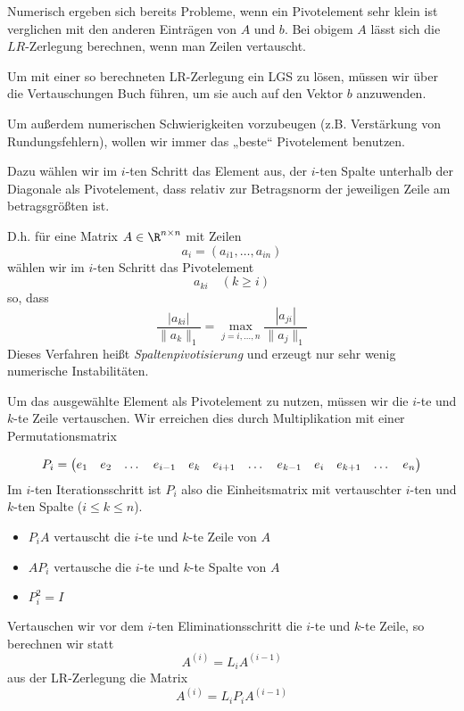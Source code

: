 \documentclass{mycourse}
\begin{document}
Numerisch ergeben sich bereits Probleme, wenn ein Pivotelement sehr klein ist verglichen mit den anderen Einträgen von $A$ und $b$.
Bei obigem $A$ lässt sich die $LR$-Zerlegung berechnen, wenn man Zeilen vertauscht.

Um mit einer so berechneten LR-Zerlegung ein LGS zu lösen, müssen wir über die Vertauschungen Buch führen, um sie auch auf den Vektor $b$ anzuwenden.

Um außerdem numerischen Schwierigkeiten vorzubeugen (z.B. Verstärkung von Rundungsfehlern), wollen wir immer das „beste“ Pivotelement benutzen.

Dazu wählen wir im $i$-ten Schritt das Element aus, der $i$-ten Spalte unterhalb der Diagonale als Pivotelement, dass relativ zur Betragsnorm der jeweiligen Zeile am betragsgrößten ist.

D.h. für eine Matrix $A\in \R^{n\times n}$ mit Zeilen
\[
	a_i = (a_{i1}, \dotsc, a_{in})
\]
wählen wir im $i$-ten Schritt das Pivotelement
\[
a_{ki} \quad (k\ge i)
\]
so, dass
\[
\frac {|a_{ki}|}{\|a_k\|_1} = \max_{j=i,\dotsc,n}\frac{|a_{ji}|}{\|a_j\|_1}
\]
Dieses Verfahren heißt \emph{Spaltenpivotisierung} und erzeugt nur sehr wenig numerische Instabilitäten.

Um das ausgewählte Element als Pivotelement zu nutzen, müssen wir die $i$-te und $k$-te Zeile vertauschen.
Wir erreichen dies durch Multiplikation mit einer Permutationsmatrix

\begin{align}
\label{eq:3.5}
\setcounter{MaxMatrixCols}{12}
P_i = \begin{pmatrix}
e_1 & e_2 & \dotsc & e_{i-1} & e_k & e_{i+1} & \dotsc & e_{k-1} & e_i & e_{k+1} & \dotsc & e_n \\
\end{pmatrix}
\end{align}
Im $i$-ten Iterationsschritt ist $P_i$ also die Einheitsmatrix mit vertauschter $i$-ten und $k$-ten Spalte ($i\le k\le n$).
\begin{itemize}
\item $P_i A$ vertauscht die $i$-te und $k$-te Zeile von $A$
\item $A P_i$ vertausche die $i$-te und $k$-te Spalte von $A$
\item $P_i^2 = I$ 
\end{itemize}

Vertauschen wir vor dem $i$-ten Eliminationsschritt die $i$-te und $k$-te Zeile, so berechnen wir statt
\[
A^{(i)} = L_i A^{(i-1)} 
\]
aus der LR-Zerlegung die Matrix
\[
A^{(i)} = L_i P_i A^{(i-1)}
\]
\end{document}

